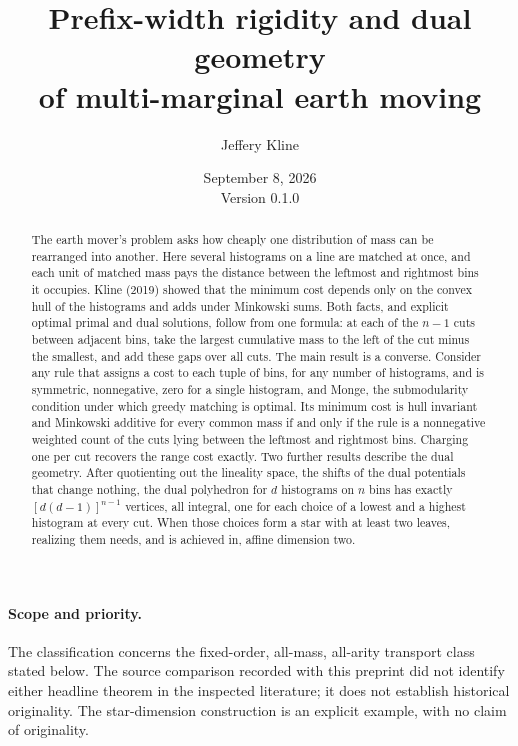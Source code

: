 \documentclass[11pt]{article}
\title{Prefix-width rigidity and dual geometry\\of multi-marginal earth moving}
\author{Jeffery Kline}
\date{September 8, 2026\\\small Version 0.1.0}
\theoremstyle{definition}\newtheorem{definition}[theorem]{Definition}
\newcommand{\1}{\mathbf 1}
\begin{document}
\maketitle
\begin{abstract}
The earth mover's problem asks how cheaply one distribution of mass can be
rearranged into another. Here several histograms on a line are matched at
once, and each unit of matched mass pays the distance between the leftmost and
rightmost bins it occupies. Kline (2019) showed that the minimum cost depends
only on the convex hull of the histograms and adds under Minkowski sums. Both
facts, and explicit optimal primal and dual solutions, follow from one formula:
at each of the $n-1$ cuts between adjacent bins, take the largest cumulative
mass to the left of the cut minus the smallest, and add these gaps over all
cuts. The main result is a converse. Consider any rule that assigns a cost to
each tuple of bins, for any number of histograms, and is symmetric,
nonnegative, zero for a single histogram, and Monge, the submodularity
condition under which greedy matching is optimal. Its minimum cost is hull
invariant and Minkowski additive for every common mass if and only if the rule
is a nonnegative weighted count of the cuts lying between the leftmost and
rightmost bins. Charging one per cut recovers the range cost exactly. Two
further results describe the dual geometry. After quotienting out the
lineality space, the shifts of the dual potentials that change nothing, the
dual polyhedron for $d$ histograms on $n$ bins has exactly $[d(d-1)]^{n-1}$
vertices, all integral, one for each choice of a lowest and a highest histogram
at every cut. When those choices form a star with at least two leaves,
realizing them needs, and is achieved in, affine dimension two.
\end{abstract}

\paragraph{Scope and priority.}
The classification concerns the fixed-order, all-mass, all-arity transport
class stated below. The source comparison recorded with this preprint did not
identify either headline theorem in the inspected literature; it does not
establish historical originality. The star-dimension construction is an
explicit example, with no claim of originality.
\end{document}
